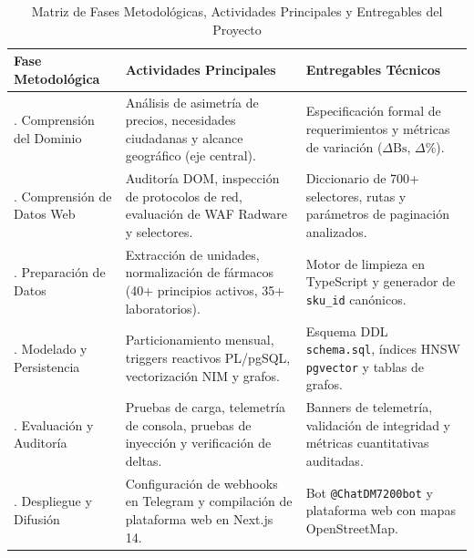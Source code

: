 \begin{table}[htbp]
    \centering
    \small
    \caption{Matriz de Fases Metodológicas, Actividades Principales y Entregables del Proyecto}
    \label{tab:fases_metodologia}
    \begin{tabularx}{\linewidth}{>{\raggedright\arraybackslash}p{3.8cm} >{\raggedright\arraybackslash}p{6.2cm} L}
        \toprule
        \textbf{Fase Metodológica} & \textbf{Actividades Principales} & \textbf{Entregables Técnicos} \\
        . Comprensión del Dominio & Análisis de asimetría de precios, necesidades ciudadanas y alcance geográfico (eje central). & Especificación formal de requerimientos y métricas de variación ($\Delta\text{Bs}$, $\Delta\%$). \\
        . Comprensión de Datos Web & Auditoría DOM, inspección de protocolos de red, evaluación de WAF Radware y selectores. & Diccionario de 700+ selectores, rutas y parámetros de paginación analizados. \\
        . Preparación de Datos & Extracción de unidades, normalización de fármacos (40+ principios activos, 35+ laboratorios). & Motor de limpieza en TypeScript y generador de \nolinkurl{sku_id} canónicos. \\
        . Modelado y Persistencia & Particionamiento mensual, triggers reactivos PL/pgSQL, vectorización NIM y grafos. & Esquema DDL \nolinkurl{schema.sql}, índices HNSW \nolinkurl{pgvector} y tablas de grafos. \\
        . Evaluación y Auditoría & Pruebas de carga, telemetría de consola, pruebas de inyección y verificación de deltas. & Banners de telemetría, validación de integridad y métricas cuantitativas auditadas. \\
        . Despliegue y Difusión & Configuración de webhooks en Telegram y compilación de plataforma web en Next.js 14. & Bot \texttt{@ChatDM7200bot} y plataforma web con mapas OpenStreetMap. \\
        \bottomrule
    \end{tabularx}
\end{table}
